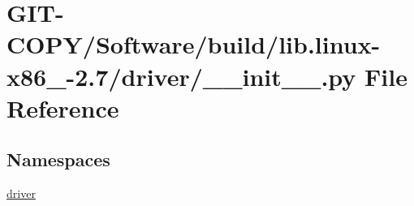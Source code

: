 \hypertarget{GIT-COPY_2Software_2build_2lib_8linux-x86__64-2_87_2driver_2____init_____8py}{}\section{G\+I\+T-\/\+C\+O\+P\+Y/\+Software/build/lib.linux-\/x86\+\_-\/2.7/driver/\+\_\+\+\_\+init\+\_\+\+\_\+.py File Reference}
\label{GIT-COPY_2Software_2build_2lib_8linux-x86__64-2_87_2driver_2____init_____8py}
\subsection*{Namespaces}
\begin{DoxyCompactItemize}
\item 
 \hyperlink{namespacedriver}{driver}
\end{DoxyCompactItemize}
